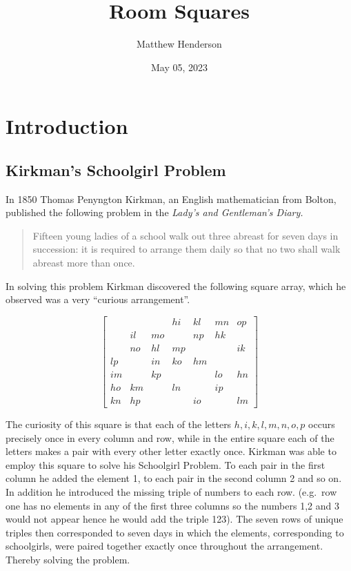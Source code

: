 \documentclass[
  11pt,
  a4paper]{book}
\title{Room Squares}
\author{Matthew Henderson}
\date{May 05, 2023}
\begin{document}
\frontmatter
\maketitle

{
\setcounter{tocdepth}{1}
\tableofcontents
}
\mainmatter
\hypertarget{introduction}{%
\chapter{Introduction}\label{introduction}}

\hypertarget{kirkmans-schoolgirl-problem}{%
\section{Kirkman's Schoolgirl
Problem}\label{kirkmans-schoolgirl-problem}}

In 1850 Thomas Penyngton Kirkman, an English mathematician from Bolton,
published the following problem in the \emph{Lady's and Gentleman's
Diary.}

\begin{quote}
Fifteen young ladies of a school walk out three abreast for seven days
in succession: it is required to arrange them daily so that no two shall
walk abreast more than once.
\end{quote}

In solving this problem Kirkman discovered the following square array,
which he observed was a very ``curious arrangement''.

\begin{equation}
  \label{eq:roomsquare}
  \begin{bmatrix}
       &    &    & hi & kl & mn & op \\
       & il & mo &    & np & hk &    \\
       & no & hl & mp &    &    & ik \\
    lp &    & in & ko & hm &    &    \\
    im &    & kp &    &    & lo & hn \\
    ho & km &    & ln &    & ip &    \\
    kn & hp &    &    & io &    & lm 
  \end{bmatrix}
\end{equation}

The curiosity of this square is that each of the letters
\(h, i, k, l, m, n, o, p\) occurs precisely once in every column and
row, while in the entire square each of the letters makes a pair with
every other letter exactly once. Kirkman was able to employ this square
to solve his Schoolgirl Problem. To each pair in the first column he
added the element 1, to each pair in the second column 2 and so on. In
addition he introduced the missing triple of numbers to each row.
(e.g.~row one has no elements in any of the first three columns so the
numbers 1,2 and 3 would not appear hence he would add the triple 123).
The seven rows of unique triples then corresponded to seven days in
which the elements, corresponding to schoolgirls, were paired together
exactly once throughout the arrangement. Thereby solving the problem.
\end{document}
